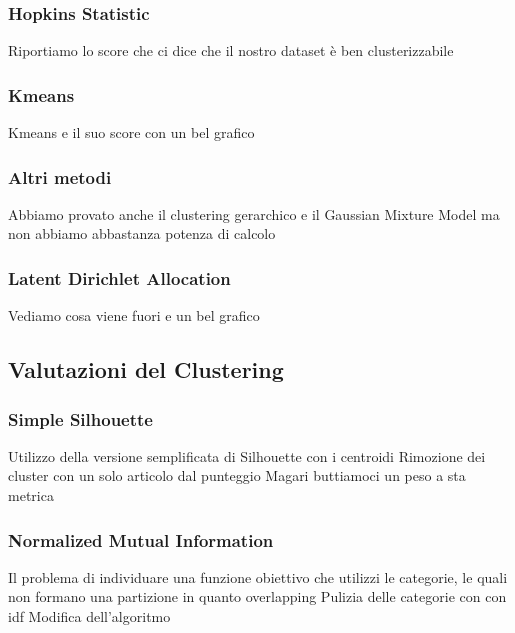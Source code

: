 \documentclass[
12pt, %
a4paper, %
oneside, %
headinclude,footinclude, %
BCOR5mm, %
]{scrartcl}
\begin{document}
		\subsubsection{Hopkins Statistic}

			Riportiamo lo score che ci dice che il nostro dataset è ben clusterizzabile

		\subsubsection{Kmeans}

			Kmeans e il suo score con un bel grafico

		\subsubsection{Altri metodi}

			Abbiamo provato anche il clustering gerarchico e il Gaussian Mixture Model
			ma non abbiamo abbastanza potenza di calcolo

		\subsubsection{Latent Dirichlet Allocation}

			Vediamo cosa viene fuori e un bel grafico


	\subsection{Valutazioni del Clustering}

		\subsubsection{Simple Silhouette}

			Utilizzo della versione semplificata di Silhouette con i centroidi
			Rimozione dei cluster con un solo articolo dal punteggio
			Magari buttiamoci un peso a sta metrica

		\subsubsection{Normalized Mutual Information}

			Il problema di individuare una funzione obiettivo che utilizzi le categorie,
			le quali non formano una partizione in quanto overlapping
			Pulizia delle categorie con con idf
			Modifica dell'algoritmo
\end{document}
